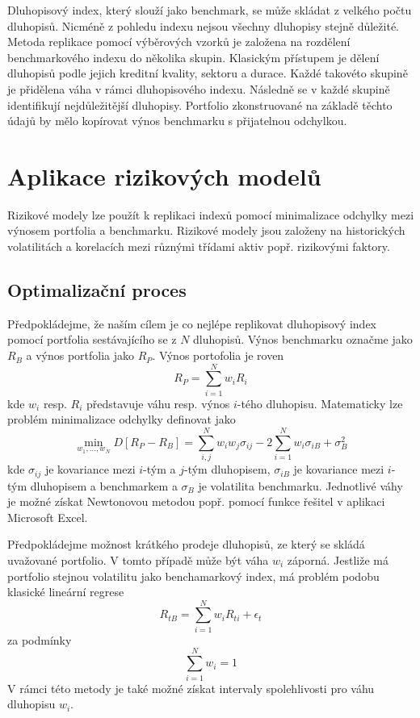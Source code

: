 \documentclass[a4paper]{book}
\begin{document}
Dluhopisový index, který slouží jako benchmark, se může skládat z velkého počtu dluhopisů. Nicméně z pohledu indexu nejsou všechny dluhopisy stejně důležité. Metoda replikace pomocí výběrových vzorků je založena na rozdělení benchmarkového indexu do několika skupin. Klasickým přístupem je dělení dluhopisů podle jejich kreditní kvality, sektoru a durace. Každé takovéto skupině je přidělena váha v rámci dluhopisového indexu. Následně se v každé skupině identifikují nejdůležitější dluhopisy. Portfolio zkonstruované na základě těchto údajů by mělo kopírovat výnos benchmarku s přijatelnou odchylkou.

\section{Aplikace rizikových modelů}

Rizikové modely lze použít k replikaci indexů pomocí minimalizace odchylky mezi výnosem portfolia a benchmarku. Rizikové modely jsou založeny na historických volatilitách a korelacích mezi různými třídami aktiv popř. rizikovými faktory.

\subsection{Optimalizační proces}

Předpokládejme, že naším cílem je co nejlépe replikovat dluhopisový index pomocí portfolia sestávajícího se z $N$ dluhopisů. Výnos benchmarku označme jako $R_B$ a výnos portfolia jako $R_P$. Výnos portofolia je roven
\begin{equation*}
R_P = \sum_{i=1}^N w_i R_i
\end{equation*}
kde $w_i$ resp. $R_i$ představuje váhu resp. výnos $i$-tého dluhopisu. Matematicky lze problém minimalizace odchylky definovat jako
\begin{equation}
\underset{w_1, \dots, w_N}{\min} D[R_P - R_B] = \sum_{i,j}^N w_i w_j \sigma_{ij} - 2 \sum_{i=1}^N w_i \sigma_{iB} + \sigma_B^2
\end{equation}
kde $\sigma_{ij}$ je kovariance mezi $i$-tým a $j$-tým dluhopisem, $\sigma_{iB}$ je kovariance mezi $i$-tým dluhopisem a benchmarkem a $\sigma_B$ je volatilita benchmarku. Jednotlivé váhy je možné získat Newtonovou metodou popř. pomocí funkce řešitel v aplikaci Microsoft Excel.

Předpokládejme možnost krátkého prodeje dluhopisů, ze který se skládá uvažované portfolio. V tomto případě může být váha $w_i$ záporná. Jestliže má portfolio stejnou volatilitu jako benchamarkový index, má problém podobu klasické lineární regrese
\begin{equation*}
R_{tB} = \sum_{i=1}^N w_i R_{ti} + \epsilon_t
\end{equation*}
za podmínky
\begin{equation*}
\sum_{i=1}^N w_i = 1
\end{equation*}
V rámci této metody je také možné získat intervaly spolehlivosti pro váhu dluhopisu $w_i$.
\end{document}
